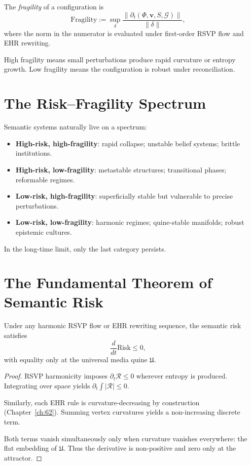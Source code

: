 \begin{definition}
The \emph{fragility} of a configuration is
\[
\mathrm{Fragility}
  := \sup_{\delta}
     \frac{
       \lVert
         \partial_t(\Phi,\mathbf{v},S,\mathcal{G})
       \rVert
     }{
       \lVert \delta \rVert
     },
\]
where the norm in the numerator is evaluated under first-order RSVP flow
and EHR rewriting.
\end{definition}

High fragility means small perturbations produce rapid curvature or
entropy growth.  
Low fragility means the configuration is robust under reconciliation.

\section{The Risk--Fragility Spectrum}

Semantic systems naturally live on a spectrum:

\begin{itemize}
\item \textbf{High-risk, high-fragility}:  
      rapid collapse; unstable belief systems; brittle institutions.
\item \textbf{High-risk, low-fragility}:  
      metastable structures; transitional phases; reformable regimes.
\item \textbf{Low-risk, high-fragility}:  
      superficially stable but vulnerable to precise perturbations.
\item \textbf{Low-risk, low-fragility}:  
      harmonic regimes; quine-stable manifolds; robust epistemic cultures.
\end{itemize}

In the long-time limit, only the last category persists.

\section{The Fundamental Theorem of Semantic Risk}

\begin{theorem}
\label{thm:risk-monotonicity}
Under any harmonic RSVP flow or EHR rewriting sequence,
the semantic risk satisfies
\[
\frac{d}{dt}\mathrm{Risk} \le 0,
\]
with equality only at the universal media quine $\mathfrak{U}$.
\end{theorem}

\begin{proof}
RSVP harmonicity imposes
$\partial_t \mathcal{R} \le 0$ wherever entropy is produced.
Integrating over space yields $\partial_t \int|\mathcal{R}| \le 0$.

Similarly, each EHR rule is curvature-decreasing by construction
(Chapter~\ref{ch:62}).  
Summing vertex curvatures yields a non-increasing discrete term.

Both terms vanish simultaneously only when curvature vanishes everywhere:
the flat embedding of $\mathfrak{U}$.  
Thus the derivative is non-positive and zero only at the attractor.
\end{proof}

